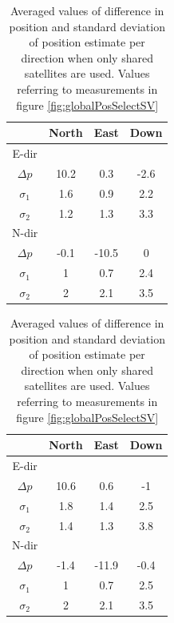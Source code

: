 \begin{table}[h!]
\begin{minipage}{0.45\linewidth}
  \begin{center} 
    \begin{tabular}{|c|c|c|c|}\hline
		& \textbf{North} & \textbf{East}& \textbf{Down}\\
      \hline
      	E-dir \\ \hline
      	$\Delta p$& 10.2 & 0.3 & -2.6\\ \hline
		$\sigma_1$& 1.6 & 0.9 & 2.2 \\\hline
		$\sigma_2$ & 1.2 &1.3 & 3.3 \\ \hline
		N-dir\\ \hline
		$\Delta p$& -0.1& -10.5 & 0 \\ \hline
		$\sigma_1$& 1 & 0.7 & 2.4 \\\hline
		$\sigma_2$ & 2 &2.1 & 3.5 \\
		\hline
	\end{tabular}
    \caption{\label{table:resultsPosAllSat} Averaged values of difference in position and standard deviation of  position estimate per direction, receivers use all available information. Values referring to measurements in figure \ref{fig:globalPosAllSV}}
  \end{center}
  
\end{minipage}
\begin{minipage}{0.45\linewidth}
  \begin{center}
    \begin{tabular}{|c|c|c|c|}\hline
		& \textbf{North} & \textbf{East}& \textbf{Down}\\
      \hline
      	E-dir\\ \hline
      	$\Delta p$& 10.6& 0.6 & -1 \\ \hline 
		$\sigma_1$& 1.8 & 1.4 & 2.5 \\\hline
		$\sigma_2$ & 1.4 &1.3 & 3.8 \\ \hline
		N-dir\\ \hline
		$\Delta p$ & -1.4 & -11.9 & -0.4 \\ \hline
		$\sigma_1$& 1 & 0.7 & 2.5 \\\hline
		$\sigma_2$ & 2 &2.1 & 3.5 \\
		\hline
    \end{tabular}
    \caption{\label{table:resultsPosSharedSat} Averaged values of difference in position and standard deviation of  position estimate per direction when only shared satellites are used. Values referring to measurements in figure \ref{fig:globalPosSelectSV}}
  \end{center}
\end{minipage}
\end{table}
